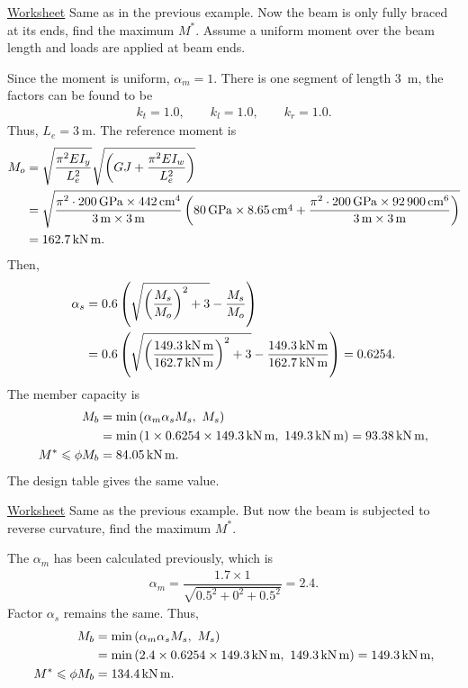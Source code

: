 \begin{exmp}\href{run:./WORKSHEET/CH05/EX5.BSSB.sm}{Worksheet}
Same as in the previous example.
Now the beam is only fully braced at its ends, find the maximum $M^*$.
Assume a uniform moment over the beam length and loads are applied at beam ends.
\end{exmp}
\begin{solution}
Since the moment is uniform, $\alpha_m=1$.
There is one segment of length \SI{3}{\meter}, the factors can be found to be
\begin{gather*}
k_t=1.0,\qquad
k_l=1.0,\qquad
k_r=1.0.
\end{gather*}
Thus, $L_e=\SI{3}{\meter}$.
The reference moment is
\begin{align*}
M_o&=\sqrt{\dfrac{\pi^2EI_y}{L_e^2}}\sqrt{\left(GJ+\dfrac{\pi^2EI_w}{L_e^2}\right)}\\&=\sqrt{\dfrac{\pi^2\cdot\SI{200}{\giga\pascal}\times\SI{442}{\centi\meter^4}}{\SI{3}{\meter}\times\SI{3}{\meter}}\left(\SI{80}{\giga\pascal}\times\SI{8.65}{\centi\meter^4}+\dfrac{\pi^2\cdot\SI{200}{\giga\pascal}\times\SI{92900}{\centi\meter^6}}{\SI{3}{\meter}\times\SI{3}{\meter}}\right)}\\&=\SI{162.7}{\kilo\newton\meter}.
\end{align*}
Then,
\begin{align*}
\alpha_s&=0.6\left(\sqrt{\left(\dfrac{M_s}{M_o}\right)^2+3}-\dfrac{M_s}{M_o}\right)\\&=0.6\left(\sqrt{\left(\dfrac{\SI{149.3}{\kilo\newton\meter}}{\SI{162.7}{\kilo\newton\meter}}\right)^2+3}-\dfrac{\SI{149.3}{\kilo\newton\meter}}{\SI{162.7}{\kilo\newton\meter}}\right)=0.6254.
\end{align*}
The member capacity is
\begin{align*}
M_b&=\min\left(\alpha_m\alpha_sM_s,~M_s\right)\\&=\min\left(1\times0.6254\times\SI{149.3}{\kilo\newton\meter},~\SI{149.3}{\kilo\newton\meter}\right)=\SI{93.38}{\kilo\newton\meter},\\M^*\leqslant\phi{}M_b&=\SI{84.05}{\kilo\newton\meter}.
\end{align*}
The design table gives the same value.
\end{solution}

\begin{exmp}\href{run:./WORKSHEET/CH05/EX5.BSSB.sm}{Worksheet}
Same as the previous example.
But now the beam is subjected to reverse curvature, find the maximum $M^*$.
\end{exmp}
\begin{solution}
The $\alpha_m$ has been calculated previously, which is
\begin{gather*}
\alpha_m=\dfrac{1.7\times1}{\sqrt{0.5^2+0^2+0.5^2}}=2.4.
\end{gather*}
Factor $\alpha_s$ remains the same.
Thus,
\begin{align*}
M_b&=\min\left(\alpha_m\alpha_sM_s,~M_s\right)\\&=\min\left(2.4\times0.6254\times\SI{149.3}{\kilo\newton\meter},~\SI{149.3}{\kilo\newton\meter}\right)=\SI{149.3}{\kilo\newton\meter},\\
M^*\leqslant\phi{}M_b&=\SI{134.4}{\kilo\newton\meter}.
\end{align*}
\end{solution}
